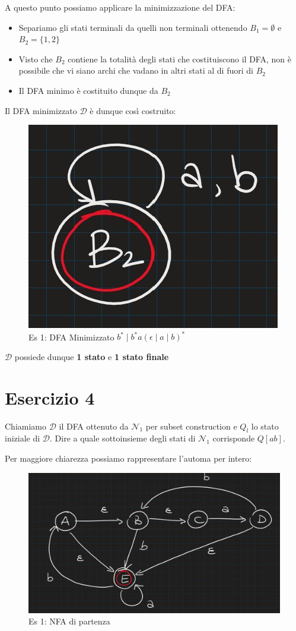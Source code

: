 \documentclass[class=book, crop=false, oneside, 12pt]{standalone}
\begin{document}
A questo punto possiamo applicare la minimizzazione del DFA:

\begin{itemize}
    \item Separiamo gli stati terminali da quelli non terminali ottenendo \(B_1 = \emptyset\) e  \(B_2 = \{1, 2\}\)
    \item Visto che \(B_2\) contiene la totalità degli stati che costituiscono il DFA, non è possibile che vi siano archi che vadano in altri stati al di fuori di \(B_2\)
    \item Il DFA minimo è costituito dunque da \(B_2\)
\end{itemize}

Il DFA minimizzato \(\mathcal{D}\) è dunque così costruito:

\begin{figure}[H]
	\centering
    \includegraphics[width=.3\textwidth]{dfa-minimized-ex3.jpg}
    \caption{Es 1: DFA Minimizzato \(b^* \mid b^* a (\epsilon \mid a \mid b)^*\)}
    \label{fig:dfa-minimized-ex3}
\end{figure}

\(\mathcal{D}\) possiede dunque \textbf{1 stato} e \textbf{1 stato finale}

\section*{Esercizio 4}

Chiamiamo \(\mathcal{D}\) il DFA ottenuto da \(\mathcal{N}_1\) per subset construction e \(Q_l\) lo stato iniziale di \(\mathcal{D}\).  Dire a quale sottoinsieme degli stati di \(\mathcal{N}_1\) corrisponde \(Q[ab]\).

Per maggiore chiarezza possiamo rappresentare l'automa per intero:

\begin{figure}[H]
	\centering
    \includegraphics[width=.8\textwidth]{nfa-ex4.jpg}
    \caption{Es 1: NFA di partenza}
    \label{fig:nfa-ex4}
\end{figure}
\end{document}
